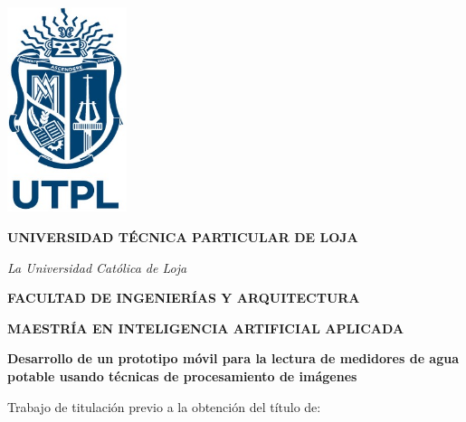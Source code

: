 \newcommand{\UTPLmotto}[1]{%
  {\bellmt\fontsize{16}{19.2}\itshape #1}%
}

\newcommand{\UTPLfaculty}{FACULTAD DE INGENIERÍAS Y ARQUITECTURA}
\newcommand{\UTPLdegree}{MAESTRÍA EN INTELIGENCIA ARTIFICIAL APLICADA}
\newcommand{\UTPLtitle}{Desarrollo de un prototipo móvil para la lectura de medidores de agua
potable usando técnicas de procesamiento de imágenes}

\newcommand{\UTPLauthor}{Pillaga Zhagñay, Luis Antonio}
\newcommand{\UTPLadvisor}{Riofrio Calderón, Guido Eduardo}

\newcommand{\UTPLcity}{LOJA}
\newcommand{\UTPLyear}{2025}


\begin{titlepage}
  \centering

  \includegraphics[width=3.5cm]{figures/logo_utpl.jpg}
  \vspace{1.5cm}

  {\fontsize{18}{21.6}\bfseries\MakeUppercase{Universidad Técnica Particular de Loja}}

  \UTPLmotto{La Universidad Católica de Loja}

  \vspace{1cm}

  {\fontsize{18}{21.6}\bfseries\MakeUppercase{\UTPLfaculty}}
  
  \vspace{0.5cm}

  {\fontsize{16}{19.2}\bfseries\MakeUppercase{\UTPLdegree}}

  \vspace{1cm}

  {\fontsize{16}{19.2}\bfseries \UTPLtitle}

  \vspace{1cm}

  Trabajo de titulación previo a la obtención del título de:


\end{titlepage}

